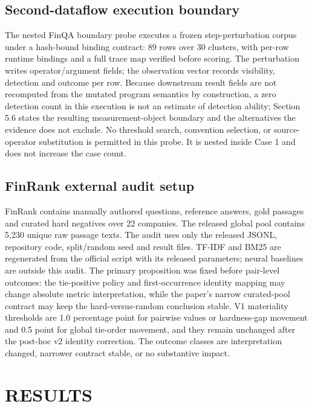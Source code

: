 \documentclass[a4paper,twoside]{article}
\begin{document}
\subsection{Second-dataflow execution boundary}
The nested FinQA boundary probe executes a frozen step-perturbation corpus under a hash-bound binding contract: 89 rows over 30 clusters, with per-row runtime bindings and a full trace map verified before scoring. The perturbation writes operator/argument fields; the observation vector records visibility, detection and outcome per row. Because downstream result fields are not recomputed from the mutated program semantics by construction, a zero detection count in this execution is not an estimate of detection ability; Section 5.6 states the resulting measurement-object boundary and the alternatives the evidence does not exclude. No threshold search, convention selection, or source-operator substitution is permitted in this probe. It is nested inside Case 1 and does not increase the case count.
\subsection{FinRank external audit setup}
FinRank contains manually authored questions, reference answers, gold passages and curated hard negatives over 22 companies. The released global pool contains 5,230 unique raw passage texts. The audit uses only the released JSONL, repository code, split/random seed and result files. TF-IDF and BM25 are regenerated from the official script with its released parameters; neural baselines are outside this audit.
The primary proposition was fixed before pair-level outcomes: the tie-positive policy and first-occurrence identity mapping may change absolute metric interpretation, while the paper's narrow curated-pool contract may keep the hard-versus-random conclusion stable. V1 materiality thresholds are 1.0 percentage point for pairwise values or hardness-gap movement and 0.5 point for global tie-order movement, and they remain unchanged after the post-hoc v2 identity correction. The outcome classes are interpretation changed, narrower contract stable, or no substantive impact.
\section{\uppercase{Results}}
\end{document}
